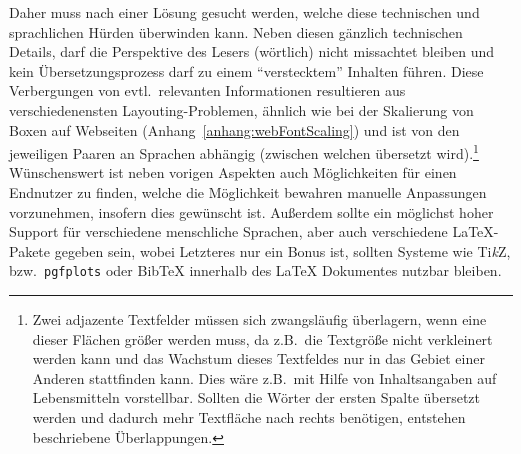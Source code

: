Daher muss nach einer Lösung gesucht werden, welche diese technischen und sprachlichen Hürden überwinden kann. Neben diesen gänzlich technischen Details, darf die Perspektive des Lesers (wörtlich) nicht missachtet bleiben und kein Übersetzungsprozess darf zu einem \enquote{verstecktem} Inhalten führen. Diese Verbergungen von evtl.\ relevanten Informationen resultieren aus verschiedenensten Layouting-Problemen, ähnlich wie bei der Skalierung von Boxen auf Webseiten (Anhang~\ref{anhang:webFontScaling}) und ist von den jeweiligen Paaren an Sprachen abhängig (zwischen welchen übersetzt wird).\footnote{Zwei adjazente Textfelder müssen sich zwangsläufig überlagern, wenn eine dieser Flächen größer werden muss, da z.B.\ die Textgröße nicht verkleinert werden kann und das Wachstum dieses Textfeldes nur in das Gebiet einer Anderen stattfinden kann. Dies wäre z.B.\ mit Hilfe von Inhaltsangaben auf Lebensmitteln vorstellbar. Sollten die Wörter der ersten Spalte übersetzt werden und dadurch mehr Textfläche nach rechts benötigen, entstehen beschriebene Überlappungen.}%
Wünschenswert ist neben vorigen Aspekten auch Möglichkeiten für einen Endnutzer zu finden, welche die Möglichkeit bewahren manuelle Anpassungen vorzunehmen, insofern dies gewünscht ist. Außerdem sollte ein möglichst hoher Support für verschiedene menschliche Sprachen, aber auch verschiedene \LaTeX{}-Pakete gegeben sein, wobei Letzteres nur ein Bonus ist, sollten Systeme wie Ti\textit{k}Z, bzw.\ \texttt{pgfplots} oder Bib\TeX{} innerhalb des \LaTeX{} Dokumentes nutzbar bleiben.%
